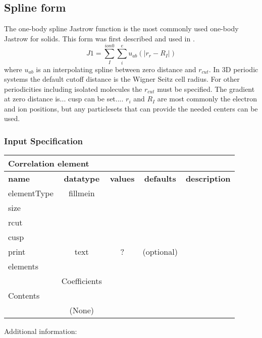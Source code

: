\subsection{Spline form}
\label{sec:onebodyjastrowspline}

The one-body spline Jastrow function is the most commonly used one-body Jastrow for solids. This form was first described and used in \cite{spline_jastrow_citation_where_is_it_from}. 
\begin{equation}
J1=\sum_I^{ion0}\sum_i^e u_{ab}(|r_r-R_I|)
\end{equation}
where $u_{ab}$ is an interpolating spline between zero distance and $r_{cut}$. In 3D periodic systems the default cutoff distance is the Wigner Seitz cell radius. For other periodicities including isolated molecules the $r_{cut}$ must be specified. The gradient at zero distance is...  cusp can be set....  $r_i$ and $R_I$ are most commonly the electron and ion positions, but any particlesets that can 
provide the needed centers can be used.

\subsubsection{Input Specification}
\begin{table}[h]
\begin{center}
\begin{tabular}{l c c c l }
\hline
\multicolumn{5}{l}{Correlation element} \\
\hline
\bfseries name & \bfseries datatype & \bfseries values & \bfseries defaults & \bfseries description \\
\hline
elementType & fillmein  & &  & \\
size &  & &  & \\
rcut &  & &  & \\
cusp&   & &  & \\
print & text & ? & (optional) &  \\
\hline
\multicolumn{5}{l}{elements}\\ \hline
& Coefficients & & & \\ \hline
\multicolumn{5}{l}{Contents}\\ \hline
& (None)  & & &  \\ \hline
\end{tabular}
\end{center}
\end{table}

Additional information:

